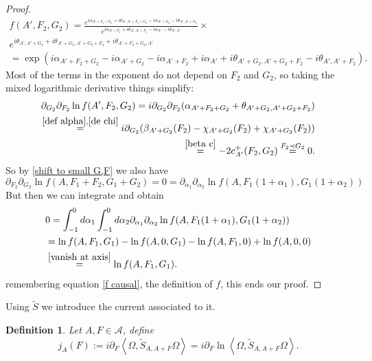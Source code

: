 \documentclass[a4paper,11pt]{article}
\newtheorem{de}{Definition}
\begin{document}
\begin{proof}
\begin{align}
f(A',F_2,G_2)=\frac{e^{i\alpha_{A'+F_2+G_2}+i\theta_{A',A'+F_2+G_2}-i\alpha_{A'+G_2}-i\theta_{A',A'+G_2}}}{e^{i\alpha_{A'+F_2}+i\theta_{A',A'+F_2}-i\alpha_{A'}-i\theta_{A',A'}}}  \times \\e^{i\theta_{A',A'+G_2}+i\theta_{A'+G_2,A'+G_2+F_2}+i\theta_{A'+F_2+G_2,A'}}\\
=\exp(i\alpha_{A'+F_2+G_2}-i\alpha_{A'+G_2}-i\alpha_{A'+F_2}+i\alpha_{A'} +i\theta_{A'+G_2,A'+G_2+F_2}-i\theta_{A',A'+F_2}).
\end{align}
Most of the terms in the exponent do not depend on \(F_2\) and \(G_2\), so taking the mixed logarithmic derivative things simplify:
\begin{align}
\partial_{G_2}\partial_{F_2} \ln f(A',F_2,G_2)=i \partial_{G_2}\partial_{F_2} (\alpha_{A'+F_2+G_2} + \theta_{A'+G_2,A'+G_2+F_2})\\
\overset{\eqref{def alpha}, \eqref{de chi}}{=} i \partial_{G_2} (\beta_{A'+G_2}(F_2)-\chi_{A'+G_2}(F_2) + \chi_{A'+G_2}(F_2))\\
\overset{\eqref{beta c}}{=}-2 c^+_{A'}(F_2,G_2)\overset{F_2\prec G_2}{=}0.
\end{align}
So by \eqref{shift to small G,F} we also have
\begin{equation}
\partial_{F_2}\partial_{G_2}\ln f(A,F_1+F_2,G_1+G_2)=0=\partial_{\alpha_1}\partial_{\alpha_2}\ln f(A,F_1(1+\alpha_1),G_1(1+\alpha_2))
\end{equation}
But then we can integrate and obtain
\begin{align}
&0=\int_{-1}^0d \alpha_1 \int_{-1}^0d \alpha_2  \partial_{\alpha_1}\partial_{\alpha_2}\ln f(A,F_1(1+\alpha_1),G_1(1+\alpha_2))\\
&=\ln f(A,F_1,G_1)-\ln f(A,0,G_1)-\ln f(A,F_1,0) + \ln f(A,0,0)\\
&\overset{\eqref{vanish at axis}}{=}\ln f(A,F_1,G_1).
\end{align}
remembering equation \eqref{f causal}, the definition of \(f\),  this ends our proof.
\end{proof}

Using \(\tilde{S}\) we introduce the current associated to it.

\begin{de}
Let \(A,F\in\mathcal{A}\), define
\begin{equation}
j_A(F):=i\partial_F \left\langle\Omega, \tilde{S}_{A,A+F}\Omega\right\rangle = i \partial_F \ln \left\langle\Omega, \tilde{S}_{A,A+F}\Omega\right\rangle.
\end{equation}
\end{de}
\end{document}
